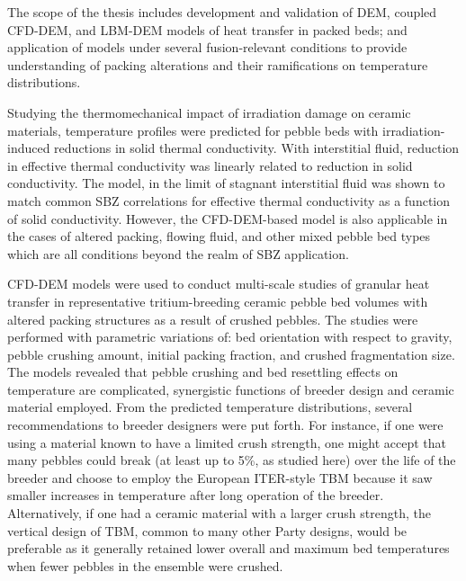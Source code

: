 The scope of the thesis includes development and validation of DEM, coupled CFD-DEM, and LBM-DEM models of heat transfer in packed beds; and application of models under several fusion-relevant conditions to provide understanding of packing alterations and their ramifications on temperature distributions.


Studying the thermomechanical impact of irradiation damage on ceramic materials, temperature profiles were predicted for pebble beds with irradiation-induced reductions in solid thermal conductivity. With interstitial fluid, reduction in effective thermal conductivity was linearly related to reduction in solid conductivity. The model, in the limit of stagnant interstitial fluid was shown to match common SBZ correlations for effective thermal conductivity as a function of solid conductivity. However, the CFD-DEM-based model is also applicable in the cases of altered packing, flowing fluid, and other mixed pebble bed types which are all conditions beyond the realm of SBZ application.

CFD-DEM models were used to conduct multi-scale studies of granular heat transfer in representative tritium-breeding ceramic pebble bed volumes with altered packing structures as a result of crushed pebbles. The studies were performed with parametric variations of: bed orientation with respect to gravity, pebble crushing amount, initial packing fraction, and crushed fragmentation size. The models revealed that pebble crushing and bed resettling effects on temperature are complicated, synergistic functions of breeder design and ceramic material employed. From the predicted temperature distributions, several recommendations to breeder designers were put forth. For instance, if one were using a material known to have a limited crush strength, one might accept that many pebbles could break (at least up to 5\%, as studied here) over the life of the breeder and choose to employ the European ITER-style TBM because it saw smaller increases in temperature after long operation of the breeder. Alternatively, if one had a ceramic material with a larger crush strength, the vertical design of TBM, common to many other Party designs, would be preferable as it generally retained lower overall and maximum bed temperatures when fewer pebbles in the ensemble were crushed.

